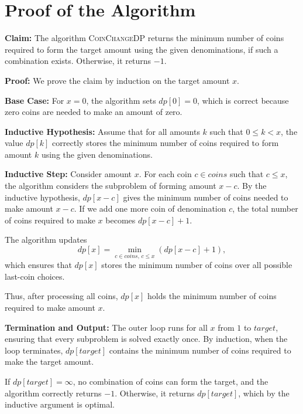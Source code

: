 \documentclass[12pt,a4paper]{report}
\begin{document}
\section{Proof of the Algorithm}

\textbf{Claim:} The algorithm \textsc{CoinChangeDP} returns the minimum number of coins required to form the target amount using the given denominations, if such a combination exists. Otherwise, it returns $-1$.

\medskip

\textbf{Proof:}  
We prove the claim by induction on the target amount $x$.

\medskip

\textbf{Base Case:}  
For $x = 0$, the algorithm sets $dp[0] = 0$, which is correct because zero coins are needed to make an amount of zero.

\medskip

\textbf{Inductive Hypothesis:}  
Assume that for all amounts $k$ such that $0 \le k < x$, the value $dp[k]$ correctly stores the minimum number of coins required to form amount $k$ using the given denominations.

\medskip

\textbf{Inductive Step:}  
Consider amount $x$.  
For each coin $c \in coins$ such that $c \le x$, the algorithm considers the subproblem of forming amount $x - c$.  
By the inductive hypothesis, $dp[x - c]$ gives the minimum number of coins needed to make amount $x - c$.  
If we add one more coin of denomination $c$, the total number of coins required to make $x$ becomes $dp[x - c] + 1$.

The algorithm updates
\[
dp[x] = \min_{c \in coins,\, c \le x} \left( dp[x - c] + 1 \right),
\]
which ensures that $dp[x]$ stores the minimum number of coins over all possible last-coin choices.

Thus, after processing all coins, $dp[x]$ holds the minimum number of coins required to make amount $x$.

\medskip

\textbf{Termination and Output:}  
The outer loop runs for all $x$ from $1$ to $target$, ensuring that every subproblem is solved exactly once.  
By induction, when the loop terminates, $dp[target]$ contains the minimum number of coins required to make the target amount.

If $dp[target] = \infty$, no combination of coins can form the target, and the algorithm correctly returns $-1$.  
Otherwise, it returns $dp[target]$, which by the inductive argument is optimal.
\end{document}
